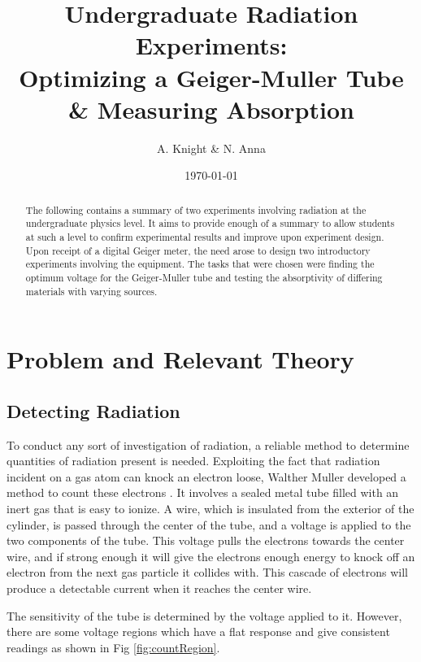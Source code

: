\documentclass[aps,twocolumn,secnumarabic,balancelastpage,amsmath,amssymb,nofootinbib]{revtex4}
\begin{document}
\title{Undergraduate Radiation Experiments: \\ Optimizing a Geiger-Muller Tube \& Measuring Absorption}
\author         {A. Knight \& N. Anna}
\date{\today}


\begin{abstract}
The following contains a summary of two experiments involving radiation at the undergraduate physics level. It aims to provide enough of a summary to allow students at such a level to confirm experimental results and improve upon experiment design. Upon receipt of a digital Geiger meter, the need arose to design two introductory experiments involving the equipment. The tasks that were chosen were finding the optimum voltage for the Geiger-Muller tube and testing the absorptivity of differing materials with varying sources.
\end{abstract}

\maketitle

\section{Problem and Relevant Theory}
\subsection{Detecting Radiation}
To conduct any sort of investigation of radiation,  a reliable method to determine quantities of radiation present is needed. Exploiting the fact that radiation incident on a gas atom can knock an electron loose, Walther Muller developed a method to count these electrons \cite{introGeiger}. It involves a sealed metal tube filled with an inert gas that is easy to ionize. A wire, which is insulated from the exterior of the cylinder, is passed through the center of the tube, and a voltage is applied to the two components of the tube. This voltage pulls the electrons towards the center wire, and if strong enough it will give the electrons enough energy to knock off an electron from the next gas particle it collides with\cite{townsend}. This cascade of electrons will produce a detectable current when it reaches the center wire.

The sensitivity of the tube is determined by the voltage applied to it. However, there are some voltage regions which have a flat response and give consistent readings as shown in Fig \ref{fig:countRegion}.
\end{document}
